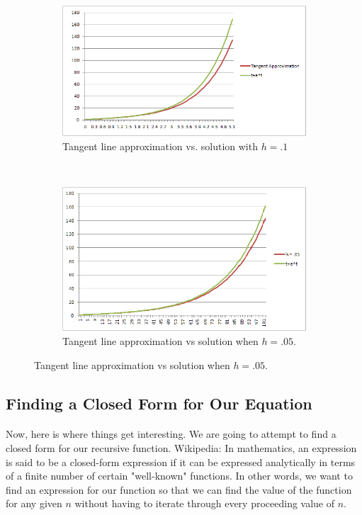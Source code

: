 \documentclass[font =22]{report}
\begin{document}
\begin{figure}[H]
\begin{subfigure}{0.5\textwidth}
\includegraphics[width=.75\textwidth]{figures/excell_data}
\caption
{
Tangent line approximation vs. solution with $h= .1$ 
}
\end{subfigure}~\quad
\begin{subfigure}{.5\textwidth}
\includegraphics[width=.75\textwidth]{figures/excell_data2}
\caption
{
Tangent line approximation vs solution when $h = .05$. 
}
\end{subfigure}
\end{figure}




\subsection*{Finding a Closed Form for Our Equation }

\paragraph{}
Now, here is where things get interesting. We are going to attempt to find a closed form for our recursive function. Wikipedia: In mathematics, an expression is said to be a closed-form expression if it can be expressed analytically in terms of a finite number of certain "well-known" functions. In other words, we want to find an expression for our function so that we can find the value of the function for any given $n$ without having to iterate through every proceeding value of $n$.
 
\end{document}
